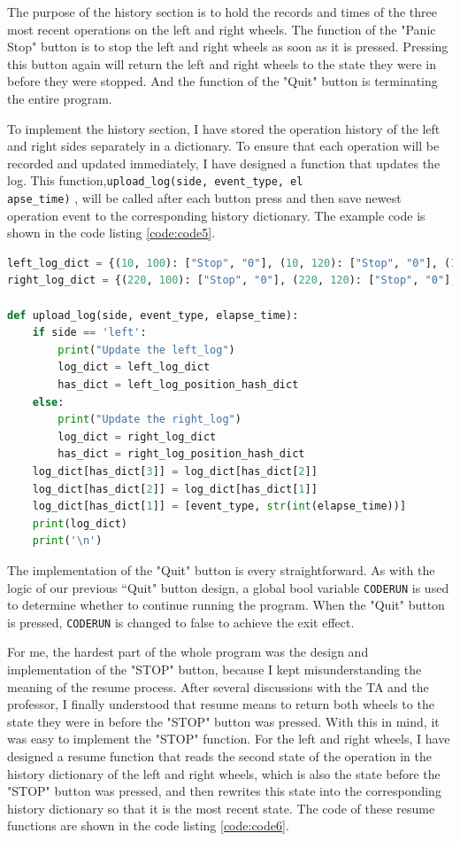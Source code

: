 \documentclass[12pt]{report}
\newcommand{\code}[1]{\colorbox{light-gray}{\texttt{#1}}}
\begin{document}
The purpose of the history section is to hold the records and times of the three most recent operations on the left and right wheels. The function of the "Panic Stop" button is to stop the left and right wheels as soon as it is pressed. Pressing this button again will return the left and right wheels to the state they were in before they were stopped. And the function of the "Quit" button is terminating the entire program.\par
To implement the history section, I have stored the operation history of the left and right sides separately in a dictionary. To ensure that each operation will be recorded and updated immediately, I have designed a function that updates the log. This function,\code{upload\_log(side, event\_type, el}\\\code{apse\_time)} , will be called after each button press and then save newest operation event to the corresponding history dictionary. The example code is shown in the code listing \ref{code:code5}.
\begin{center}
\begin{lstlisting}[language=Python, label=code:code5, caption= Update log history] 
left_log_dict = {(10, 100): ["Stop", "0"], (10, 120): ["Stop", "0"], (10, 140): ["Stop", "0"]}
right_log_dict = {(220, 100): ["Stop", "0"], (220, 120): ["Stop", "0"], (220, 140): ["Stop", "0"]}

def upload_log(side, event_type, elapse_time):
    if side == 'left':
        print("Update the left_log")
        log_dict = left_log_dict
        has_dict = left_log_position_hash_dict
    else:
        print("Update the right_log")
        log_dict = right_log_dict
        has_dict = right_log_position_hash_dict
    log_dict[has_dict[3]] = log_dict[has_dict[2]]
    log_dict[has_dict[2]] = log_dict[has_dict[1]]
    log_dict[has_dict[1]] = [event_type, str(int(elapse_time))]
    print(log_dict)
    print('\n')
\end{lstlisting}
\end{center}\vspace{-2em}
The implementation of the "Quit" button is every straightforward. As with the logic of our previous “Quit" button design, a global bool variable \code{CODERUN} is used to determine whether to continue running the program. When the "Quit" button is pressed, \code{CODERUN} is changed to false to achieve the exit effect.\par
For me, the hardest part of the whole program was the design and implementation of the "STOP" button, because I kept misunderstanding the meaning of the resume process. After several discussions with the TA and the professor, I finally understood that resume means to return both wheels to the state they were in before the "STOP" button was pressed. With this in mind, it was easy to implement the "STOP" function. For the left and right wheels, I have designed a resume function that reads the second state of the operation in the history dictionary of the left and right wheels, which is also the state before the "STOP" button was pressed, and then rewrites this state into the corresponding history dictionary so that it is the most recent state. The code of these resume functions are shown in the code listing \ref{code:code6}.
\end{document}
